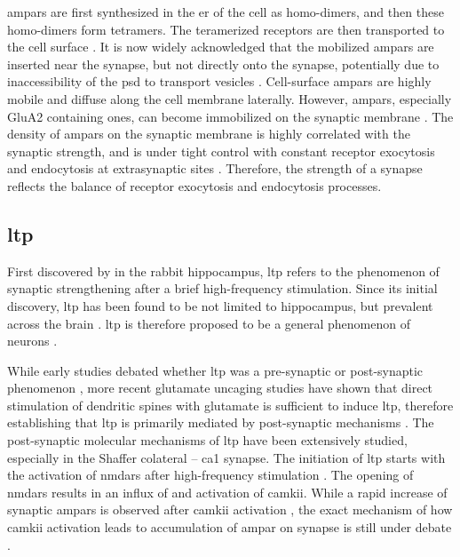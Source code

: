 \Glspl{ampar} are first synthesized in the \gls{er} of the cell as homo-dimers, and then these homo-dimers form tetramers. The teramerized receptors are then transported to the cell surface \citep{henley13}. It is now widely acknowledged that the mobilized \glspl{ampar} are inserted near the synapse, but not directly onto the synapse, potentially due to inaccessibility of the \gls{psd} to transport vesicles \citep{henley11, chater14}. Cell-surface \glspl{ampar} are highly mobile and diffuse along the cell membrane laterally. However, \glspl{ampar}, especially GluA2 containing ones, can become immobilized on the synaptic membrane \citep{borgdorff02, groc04}. The density of \glspl{ampar} on the synaptic membrane is highly correlated with the synaptic strength, and is under tight control with constant receptor exocytosis and endocytosis at extrasynaptic sites \citep{malinow02, henley11}. Therefore, the strength of a synapse reflects the balance of receptor exocytosis and endocytosis processes. 

\subsection{\gls{ltp}}

First discovered by \citet{bliss73} in the rabbit hippocampus, \gls{ltp} refers to the phenomenon of synaptic strengthening after a brief high-frequency stimulation. Since its initial discovery, \gls{ltp} has been found to be not limited to hippocampus, but prevalent across the brain \citep[e.g.][]{clugnet90}. \gls{ltp} is therefore proposed to be a general phenomenon of neurons \citep{malenka04}. 

While early studies debated whether \gls{ltp} was a pre-synaptic or post-synaptic phenomenon \citep{malinow90, bekkers90, isaac95, liao95}, more recent glutamate uncaging studies have shown that direct stimulation of dendritic spines with glutamate is sufficient to induce \gls{ltp}, therefore establishing that \gls{ltp} is primarily mediated by post-synaptic mechanisms \citep{kerchner08}. The post-synaptic molecular mechanisms of \gls{ltp} have been extensively studied, especially in the Shaffer colateral -- \gls{ca1} synapse. The initiation of \gls{ltp} starts with the activation of \glspl{nmdar} after high-frequency stimulation \citep{collingridge83}. The opening of \glspl{nmdar} results in an influx of  and activation of \gls{camkii}. While a rapid increase of synaptic \glspl{ampar} is observed after \gls{camkii} activation \citep{patterson10}, the exact mechanism of how \gls{camkii} activation leads to accumulation of \gls{ampar} on synapse is still under debate \citep{herring16}. 

